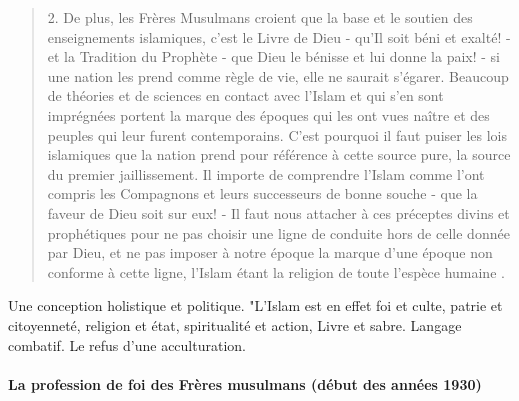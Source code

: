 \begin{quote}
2.
  De plus, les Frères Musulmans croient que la base et le soutien des
  enseignements islamiques, c'est le Livre de Dieu - qu'Il soit béni et
  exalté! - et la Tradition du Prophète - que Dieu le bénisse et lui
  donne la paix! - si une nation les prend comme règle de vie, elle ne
  saurait s'égarer. Beaucoup de théories et de sciences en contact avec
  l'Islam et qui s'en sont imprégnées portent la marque des époques qui
  les ont vues naître et des peuples qui leur furent contemporains.
  C'est pourquoi il faut puiser les lois islamiques que la nation prend
  pour référence à cette source pure, la source du premier
  jaillissement. Il importe de comprendre l'Islam comme l'ont compris
  les Compagnons et leurs successeurs de bonne souche - que la faveur de
  Dieu soit sur eux! - Il faut nous attacher à ces préceptes divins et
  prophétiques pour ne pas choisir une ligne de conduite hors de celle
  donnée par Dieu, et ne pas imposer à notre époque la marque d'une
  époque non conforme à cette ligne, l'Islam étant la religion de toute
  l'espèce humaine .
\end{quote}

  \begin{Synthesis}
   Une conception holistique et politique.  "L'Islam est en effet foi et culte, patrie et citoyenneté, religion et état, spiritualité et action, Livre et sabre. Langage combatif. 
  Le refus d'une acculturation. 
  \end{Synthesis}
 

\paragraph{La profession de foi des Frères musulmans (début des années 1930)}




